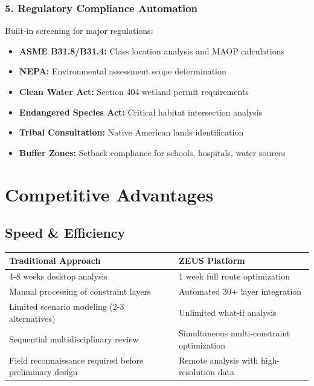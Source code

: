 \documentclass[11pt,letterpaper]{article}
\begin{document}
\subsubsection{5. Regulatory Compliance Automation}

Built-in screening for major regulations:

\begin{itemize}[leftmargin=*]
    \item \textbf{ASME B31.8/B31.4:} Class location analysis and MAOP calculations
    \item \textbf{NEPA:} Environmental assessment scope determination
    \item \textbf{Clean Water Act:} Section 404 wetland permit requirements
    \item \textbf{Endangered Species Act:} Critical habitat intersection analysis
    \item \textbf{Tribal Consultation:} Native American lands identification
    \item \textbf{Buffer Zones:} Setback compliance for schools, hospitals, water sources
\end{itemize}

\newpage

\section{Competitive Advantages}

\subsection{Speed \& Efficiency}

\begin{tabularx}{\textwidth}{X|X}
\toprule
\textbf{Traditional Approach} & \textbf{ZEUS Platform}\\
\midrule
4-8 weeks desktop analysis & 1 week full route optimization\\
Manual processing of constraint layers & Automated 30+ layer integration\\
Limited scenario modeling (2-3 alternatives) & Unlimited what-if analysis\\
Sequential multidisciplinary review & Simultaneous multi-constraint optimization\\
Field reconnaissance required before preliminary design & Remote analysis with high-resolution data\\
\bottomrule
\end{tabularx}
\end{document}
